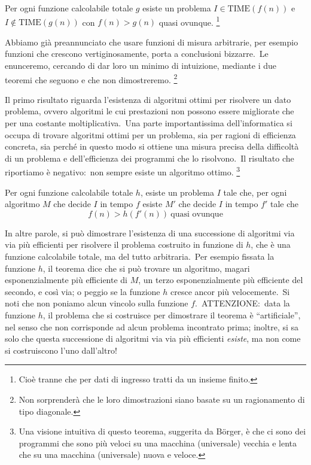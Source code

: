 \begin{theorem}
    Per ogni funzione calcolabile totale $g$ esiste un problema $I \in \mathrm{TIME}(f(n))$ e $I \not \in \mathrm{TIME}(g(n))$ con $f(n) > g(n)$ quasi ovunque.
    \footnote{Cioè tranne che per dati di ingresso tratti da un insieme finito.}
\end{theorem}

\noindent Abbiamo già preannunciato che usare funzioni di misura arbitrarie, per esempio funzioni che crescono vertiginosamente, porta a conclusioni bizzarre.\
Le enunceremo, cercando di dar loro un minimo di intuizione, mediante i due teoremi che seguono e che non dimostreremo.
\footnote{Non sorprenderà che le loro dimostrazioni siano basate su un ragionamento di tipo diagonale.}

Il primo risultato riguarda l'esistenza di algoritmi ottimi per risolvere un dato problema, ovvero algoritmi le cui prestazioni non possono essere migliorate che per una costante moltiplicativa.\
Una parte importantissima dell'informatica si occupa di trovare algoritmi ottimi per un problema, sia per ragioni di efficienza concreta, sia perché in questo modo si ottiene una misura precisa della difficoltà di un problema e dell'efficienza dei programmi che lo risolvono.\
Il risultato che riportiamo è negativo:\ non sempre esiste un algoritmo ottimo.
\footnote{Una visione intuitiva di questo teorema, suggerita da B\"orger, è che ci sono dei programmi che sono più veloci su una macchina (universale) vecchia e lenta che su una macchina (universale) nuova e veloce.}

\begin{theorem} [di accelerazione, Blum]
    Per ogni funzione calcolabile totale $h$, esiste un problema $I$ tale che, per ogni algoritmo $M$ che decide $I$ in tempo $f$ esiste $M'$ che decide $I$ in tempo $f'$ tale che
    \[f(n) > h(f'(n))\ \mbox{quasi ovunque}\]
\end{theorem}

\noindent In altre parole, si può dimostrare l'esistenza di una successione di algoritmi via via più efficienti per risolvere il problema costruito in funzione di $h$, che è una funzione calcolabile totale, ma del tutto arbitraria.\
Per esempio fissata la funzione $h$, il teorema dice che si può trovare un algoritmo, magari esponenzialmente più efficiente di $M$, un terzo esponenzialmente più efficiente del secondo, e così via; o peggio se la funzione $h$ cresce ancor più velocemente.\
Si noti che non poniamo alcun vincolo sulla funzione $f$.\
ATTENZIONE:\ data la funzione $h$, il problema che si costruisce per dimostrare il teorema è ``artificiale'', nel senso che non corrisponde ad alcun problema incontrato prima; inoltre, si sa solo che questa successione di algoritmi via via più efficienti \textit{esiste}, ma non come si costruiscono l'uno dall'altro!\

